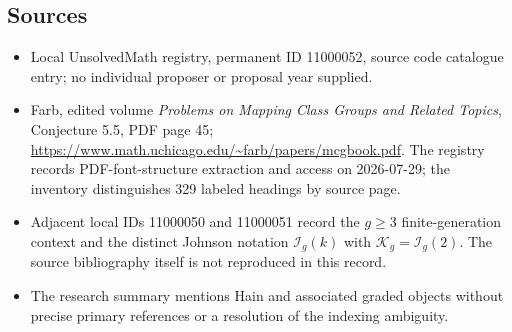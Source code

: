 \documentclass[11pt]{article}
\begin{document}
\subsection{Sources}
\begin{itemize}
\item Local UnsolvedMath registry, permanent ID 11000052, source code catalogue entry; no individual proposer or proposal year supplied.
\item Farb, edited volume \emph{Problems on Mapping Class Groups and Related Topics}, Conjecture 5.5, PDF page 45; \url{https://www.math.uchicago.edu/~farb/papers/mcgbook.pdf}. The registry records PDF-font-structure extraction and access on 2026-07-29; the inventory distinguishes 329 labeled headings by source page.
\item Adjacent local IDs 11000050 and 11000051 record the $g\ge3$ finite-generation context and the distinct Johnson notation $\mathcal I_g(k)$ with $\mathcal K_g=\mathcal I_g(2)$. The source bibliography itself is not reproduced in this record.
\item The research summary mentions Hain and associated graded objects without precise primary references or a resolution of the indexing ambiguity.
\end{itemize}
\end{document}
